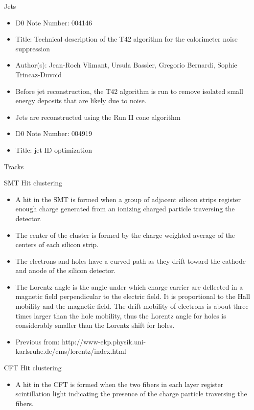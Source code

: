  Jets
 
\begin{itemize}
\item D0 Note Number: 004146
\item Title: Technical description of the T42 algorithm for the calorimeter noise suppression
\item Author(s): Jean-Roch Vlimant, Ursula Bassler, Gregorio Bernardi, Sophie Trincaz-Duvoid
\item Before jet reconstruction, the T42 algorithm is run to remove isolated small energy deposits that are likely due to noise.
\item Jets are reconstructed using the Run II cone algorithm~\cite{Blazey:2000qt}
\item D0 Note Number: 004919
\item Title: jet ID optimization
\end{itemize}


Tracks

SMT Hit clustering
\begin{itemize}
\item A hit in the SMT is formed when a group of adjacent silicon strips register enough charge generated from an ionizing charged particle traversing the detector.
\item The center of the cluster is formed by the charge weighted average of the centers of each silicon strip.
\item The electrons and holes have a curved path as they drift toward the cathode and anode of the silicon detector.
\item The Lorentz angle is the angle under which charge carrier are deflected in a magnetic field perpendicular to the electric field. It is proportional to the Hall mobility and the magnetic field. The drift mobility of electrons is about three times larger than the hole mobility, thus the Lorentz angle for holes is considerably smaller than the Lorentz shift for holes.
\item Previous from: http://www-ekp.physik.uni-karlsruhe.de/cms/lorentz/index.html
\end{itemize}

CFT Hit clustering
\begin{itemize}
\item A hit in the CFT is formed when the two fibers in each layer register scintillation light indicating the presence of the charge particle traversing the fibers.
\end{itemize}



